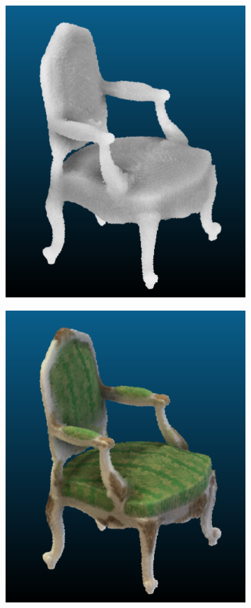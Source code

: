 \documentclass{article}
\begin{document}
\begin{figure}[!h]
 \centering
\begin{subfigure}{.24\textwidth}
  \centering
  \includegraphics[width=\linewidth]{figs/carve/chair.png}  
\end{subfigure}
\begin{subfigure}{.24\textwidth}
  \centering
  \includegraphics[width=\linewidth]{figs/carve/chairc.png}  

\end{subfigure}
\end{figure}
\end{document}
